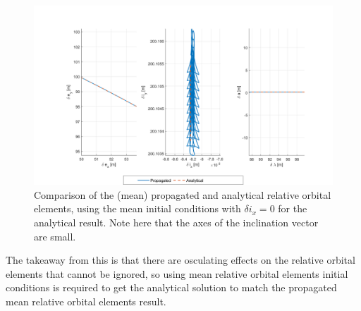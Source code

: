 \begin{figure}[H]
    \centering
    \includegraphics[width=0.8\linewidth]{sim/figures/PS4/ROE_analytical_compare_mean_IC3_SV2.png}
    \caption{Comparison of the (mean) propagated and analytical relative orbital elements, using the mean initial conditions with $\delta i_x = 0$ for the analytical result. Note here that the axes of the inclination vector are small.}
\label{fig:roe_analytical_compare_mean_zeroed}
\end{figure}

The takeaway from this is that there are osculating effects on the relative orbital elements that cannot be ignored, so using mean relative orbital elements initial conditions is required to get the analytical solution to match the propagated mean relative orbital elements result.
